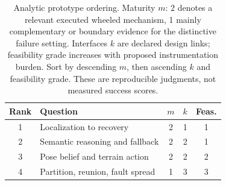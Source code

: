 \begin{table}[t]
\centering
\caption{Analytic prototype ordering. Maturity $m$: 2 denotes a relevant executed wheeled mechanism, 1 mainly complementary or boundary evidence for the distinctive failure setting. Interfaces $k$ are declared design links; feasibility grade increases with proposed instrumentation burden. Sort by descending $m$, then ascending $k$ and feasibility grade. These are reproducible judgments, not measured success scores.}
\label{tab:gaps}
\footnotesize
\begin{tabular}{@{}clccc@{}}
\toprule
Rank & Question & $m$ & $k$ & Feas. \\
\midrule
1 & Localization to recovery & 2 & 1 & 1 \\
2 & Semantic reasoning and fallback & 2 & 2 & 1 \\
3 & Pose belief and terrain action & 2 & 2 & 2 \\
4 & Partition, reunion, fault spread & 1 & 3 & 3 \\
\bottomrule
\end{tabular}
\end{table}
